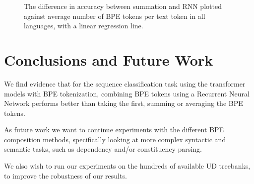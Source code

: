 \documentclass[11pt]{article}
\begin{document}
\begin{figure}
        \caption{The difference in accuracy between summation and RNN plotted against average number of BPE
     tokens per text token in all languages, with a linear regression line.}
    \label{fig:scatter_len}
    \end{figure}
    
    
    \section{Conclusions and Future Work}
    
    We find evidence that for the sequence classification task using
    the transformer models with BPE tokenization, combining BPE tokens
    using a Recurrent Neural Network performs better than taking the
    first, summing or averaging the BPE tokens.

    As future work we want to continue experiments with the different
    BPE composition methods, specifically looking at more complex
    syntactic and semantic tasks, such as dependency and/or
    constituency parsing.

        We also wish to run our experiments on the hundreds
     of available UD treebanks, to improve the robustness of our
     results.  
    

	
	
	
\end{document}
